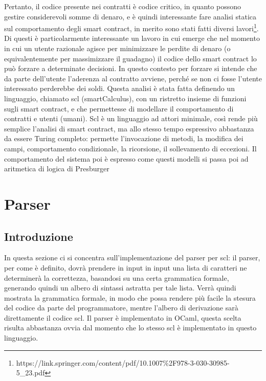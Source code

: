 \documentclass[]{article}
\begin{document}
Pertanto, il codice presente nei contratti è codice critico, in quanto
possono gestire considerevoli somme di denaro, e è quindi interessante
fare analisi statica sul comportamento degli smart contract, in merito
sono stati fatti diversi lavori\footnote{https://link.springer.com/content/pdf/10.1007\%2F978-3-030-30985-5\_23.pdf}.
Di questi è particolarmente interessante un lavoro in cui emerge che nel
momento in cui un utente razionale agisce per minimizzare le perdite di
denaro (o equivalentemente per massimizzare il guadagno) il codice dello
smart contract lo può forzare a determinate decisioni. In questo
contesto per forzare si intende che da parte dell'utente l'aderenza al
contratto avviene, perché se non ci fosse l'utente interessato
perderebbe dei soldi. Questa analisi è stata fatta definendo un
linguaggio, chiamato scl (smartCalculus), con un ristretto insieme di
funzioni sugli smart contract, e che permettesse di modellare il
comportamento di contratti e utenti (umani). Scl è un linguaggio ad
attori minimale, così rende più semplice l'analisi di smart contract, ma
allo stesso tempo espressivo abbastanza da essere Turing completo:
permette l'invocazione di metodi, la modifica dei campi, comportamento
condizionale, la ricorsione, il sollevamento di eccezioni. Il
comportamento del sistema poi è espresso come questi modelli si passa
poi ad aritmetica di logica di Presburger

\hypertarget{parser}{%
\section{Parser}\label{parser}}

\hypertarget{introduzione-1}{%
\subsection{Introduzione}\label{introduzione-1}}

In questa sezione ci si concentra sull'implementazione del parser per
scl: il parser, per come è definito, dovrà prendere in input in input
una lista di caratteri ne determinerà la correttezza, basandosi su una
certa grammatica formale, generando quindi un albero di sintassi
astratta per tale lista. Verrà quindi mostrata la grammatica formale, in
modo che possa rendere più facile la stesura del codice da parte del
programmatore, mentre l'albero di derivazione sarà direttamente il
codice scl. Il parser è implementato in OCaml, questa scelta risulta
abbastanza ovvia dal momento che lo stesso scl è implementato in questo
linguaggio.
\end{document}
